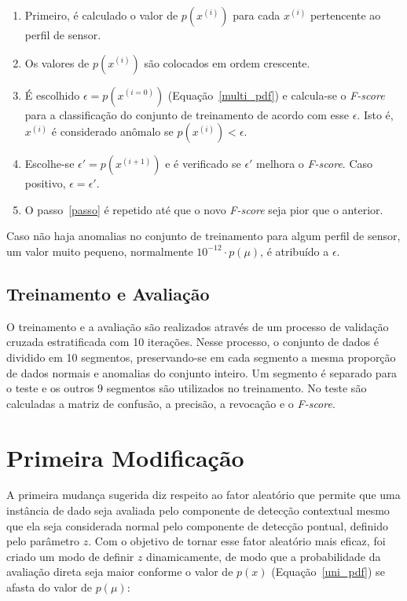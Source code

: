 \documentclass[cic,tc]{iiufrgs}
\begin{document}
\begin{enumerate}
     \item Primeiro, é calculado o valor de $p(x^{(i)})$ para cada $x^{(i)}$ pertencente ao perfil de sensor.
     \item Os valores de $p(x^{(i)})$ são colocados em ordem crescente.
     \item É escolhido $\epsilon = p(x^{(i=0)})$ (Equação~\ref{multi_pdf}) e calcula-se o \textit{F-score} para a classificação do conjunto de treinamento de acordo com esse $\epsilon$. Isto é, $x^{(i)}$ é considerado anômalo se $p(x^{(i)}) < \epsilon$.
     \item \label{passo} Escolhe-se $\epsilon' = p(x^{(i+1)})$ e é verificado se $\epsilon'$ melhora o \textit{F-score}. Caso positivo, $\epsilon = \epsilon'$.
     \item O passo~\ref{passo} é repetido até que o novo \textit{F-score} seja pior que o anterior.
     
\end{enumerate}

Caso não haja anomalias no conjunto de treinamento para algum perfil de sensor, um valor muito pequeno, normalmente $10^{-12}\cdot p(\mu)$, é atribuído a $\epsilon$. 

\subsection{Treinamento e Avaliação}
O treinamento e a avaliação são realizados através de um processo de validação cruzada estratificada com 10 iterações. Nesse processo, o conjunto de dados é dividido em 10 segmentos, preservando-se em cada segmento a mesma proporção de dados normais e anomalias do conjunto inteiro. Um segmento é separado para o teste e os outros 9 segmentos são utilizados no treinamento. No teste são calculadas a matriz de confusão, a precisão, a revocação e o \textit{F-score}.

\section{Primeira Modificação}
\label{mod_1}
A primeira mudança sugerida diz respeito ao fator aleatório que permite que uma instância de dado seja avaliada pelo componente de detecção contextual mesmo que ela seja considerada normal pelo componente de detecção pontual, definido pelo parâmetro $z$. Com o objetivo de tornar esse fator aleatório mais eficaz, foi criado um modo de definir $z$ dinamicamente, de modo que a probabilidade da avaliação direta seja maior conforme o valor de $p(x)$ (Equação~\ref{uni_pdf}) se afasta do valor de $p(\mu)$:
\end{document}
